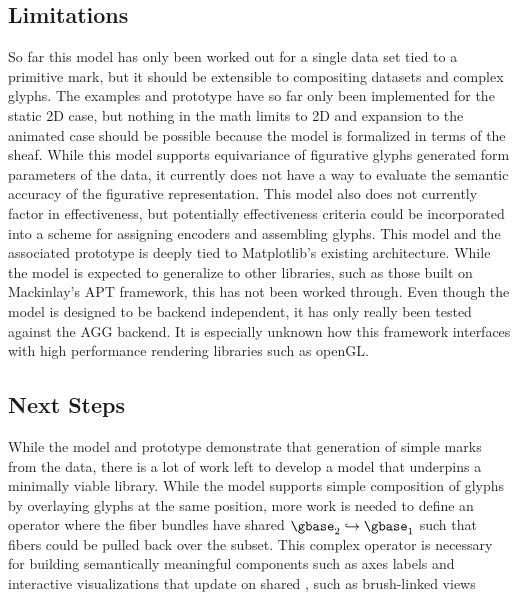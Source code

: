 \documentclass[../main.tex]{subfiles}
\begin{document}
\subsection{Limitations}

So far this model has only been worked out for a single data set tied to a primitive mark, but it should be extensible to compositing datasets and complex glyphs. The examples and prototype have so far only been implemented for the static 2D case, but nothing in the math limits to 2D and expansion to the animated case should be possible because the model is formalized in terms of the sheaf. While this model supports equivariance of figurative glyphs generated form parameters of the data\cite{beckfeathers2014,byrneFigurativeFramesCritical2017}, it currently does not have a way to evaluate the semantic accuracy of the figurative representation. This model also does not currently factor in effectiveness, but potentially effectiveness criteria could be incorporated into a scheme for assigning encoders and assembling glyphs. This model and the associated prototype is deeply tied to Matplotlib's existing architecture. While the model is expected to generalize to other libraries, such as those built on Mackinlay's APT framework, this has not been worked through. Even though the model is designed to be backend independent, it has only really been tested against the AGG backend. It is especially unknown how this framework interfaces with high performance rendering libraries such as openGL\cite{CarsonOpenGL1997}.

\subsection{Next Steps}
While the model and prototype demonstrate that generation of simple marks from the data, there is a lot of work left to develop a model that underpins a minimally viable library. While the model supports simple composition of glyphs by overlaying glyphs at the same position, more work is needed to define an operator where the fiber bundles have shared $\gbase_2 \hookrightarrow \gbase_1$ such that fibers could be pulled back over the subset. This complex operator is necessary for building semantically meaningful components such as axes labels and interactive visualizations that update on shared \gbase, such as brush-linked views\cite{} 
\end{document}
